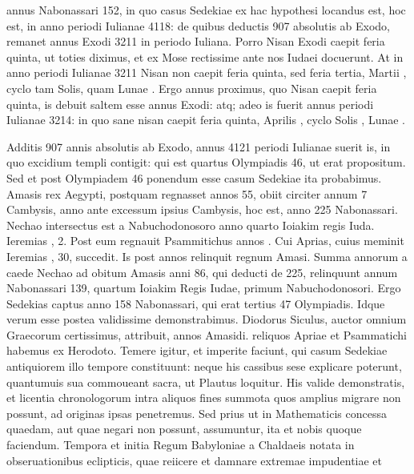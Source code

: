annus Nabonassari 152, in quo casus Sedekiae ex hac hypothesi
locandus est, hoc est, in anno periodi Iulianae %
 4118: de quibus deductis
907 absolutis ab Exodo, remanet annus Exodi 3211 in periodo Iuliana.
Porro Nisan Exodi caepit feria quinta, ut toties diximus, et ex
Mose rectissime ante nos Iudaei %
 docuerunt.
At in anno periodi Iulianae %
3211 Nisan non caepit feria quinta, sed feria tertia,
 Martii , cyclo tam
Solis, quam Lunae .
Ergo annus proximus, quo Nisan caepit feria
quinta, is debuit saltem esse annus Exodi: atq; adeo is fuerit annus periodi
Iulianae 3214: in quo sane nisan caepit feria quinta, Aprilis ,
cyclo Solis , Lunae .

Additis 907 annis absolutis ab Exodo,
annus 4121 periodi Iulianae suerit is, in quo excidium templi contigit:
qui est quartus Olympiadis 46, ut erat propositum.
Sed et post
Olympiadem 46 ponendum esse casum Sedekiae ita probabimus.
Amasis rex Aegypti, postquam regnasset annos 55, obiit circiter annum
7 Cambysis, anno ante excessum ipsius Cambysis, hoc est, anno
225 Nabonassari.
Nechao intersectus est a Nabuchodonosoro anno
quarto Ioiakim regis Iuda.
Ieremias , 2.
Post eum regnauit
Psammitichus annos .
Cui Aprias, cuius meminit Ieremias
, 30, succedit.
Is post  annos relinquit regnum Amasi.
Summa annorum a caede Nechao ad obitum Amasis anni 86, qui
deducti de 225, relinquunt annum Nabonassari 139, quartum Ioiakim
Regis Iudae, primum Nabuchodonosori.
Ergo Sedekias captus
anno 158 Nabonassari, qui erat tertius 47 Olympiadis.
Idque verum
esse postea validissime demonstrabimus.
Diodorus Siculus,
auctor omnium Graecorum certissimus, attribuit,  annos Amasidi.
reliquos Apriae et Psammatichi habemus ex Herodoto.
Temere
igitur, et imperite faciunt, qui casum Sedekiae antiquiorem illo
tempore constituunt: neque his cassibus sese explicare poterunt,
quantumuis sua commoueant sacra, ut Plautus loquitur.
His valide
demonstratis, et licentia chronologorum intra aliquos fines summota
quos amplius migrare non possunt, ad originas ipsas penetremus.
Sed prius ut in Mathematicis concessa quaedam, aut quae negari
non possunt, assumuntur, ita et nobis quoque faciendum.
Tempora et initia Regum Babyloniae a Chaldaeis notata in obseruationibus
eclipticis, quae reiicere et damnare extremae impudentiae et
